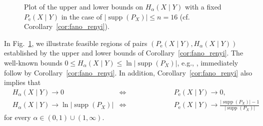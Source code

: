 \documentclass[conference, draftcls, onecolumn]{IEEEtran}
\theoremstyle{plain}
\newcommand{\supp}{\operatorname{supp}}
\newcommand{\figref}[1]{Fig.~\ref{#1}}
\newcommand{\corref}[1]{Corollary~\ref{#1}}
\begin{document}
\begin{figure}[!t]
\centering
{}\hfill
{}
\caption{Plot of the upper and lower bounds on $H_{\alpha}(X \mid Y)$ with a fixed $P_{\mathrm{e}}(X \mid Y)$ in the case of $|\!\supp( P_{X} )| \le n = 16$ (cf. \corref{cor:fano_renyi}).}
\label{fig:H_Pe}
\end{figure}





In \figref{fig:H_Pe}, we illustrate feasible regions of pairs $(P_{\mathrm{e}}(X \mid Y), H_{\alpha}(X \mid Y))$ established by the upper and lower bounds of \corref{cor:fano_renyi}.
The well-known bounds $0 \le H_{\alpha}(X \mid Y) \le \ln | \!\supp( P_{X} ) |$, e.g., \cite[Proposition~3]{fehr}, immediately follow by \corref{cor:fano_renyi}.
In addition, \corref{cor:fano_renyi} also implies that
\begin{align}
&
H_{\alpha}(X \mid Y)
\to
0
& \iff
& \qquad \qquad \qquad
P_{\mathrm{e}}(X \mid Y)
\to
0 ,
\\
&
H_{\alpha}(X \mid Y)
\to
\ln |\! \supp( P_{X} )|
& \iff
& \qquad \qquad \qquad
P_{\mathrm{e}}(X \mid Y)
\to
\frac{ |\! \supp( P_{X} )| - 1 }{ |\! \supp( P_{X} )| }
\end{align}
for every $\alpha \in (0, 1) \cup (1, \infty)$.
\end{document}
